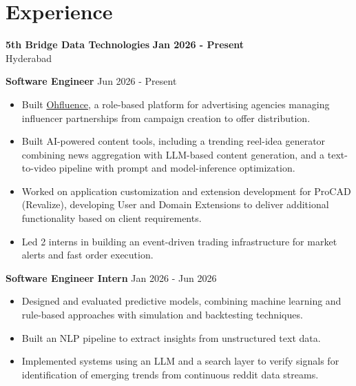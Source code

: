 \documentclass[a4paper,11pt]{article}
\newcommand{\resumeItem}[1]{\item \small{#1}}
\newcommand{\resumeSubheading}[4]{%
  \textbf{#1} \hfill \textbf{#2} \\
{#3} \hfill {#4}
}
\newcommand{\resumeSubHeadingListStart}{\begin{itemize}}
\newcommand{\resumeSubHeadingListEnd}{\end{itemize}}
\begin{document}
\section*{Experience}

\resumeSubheading
{5th Bridge Data Technologies}{Jan 2026 - Present}
{Hyderabad}{}

\textbf{Software Engineer} \hfill {Jun 2026 - Present}
\resumeSubHeadingListStart
\resumeItem{Built \href{https://ohfluence.com}{Ohfluence}, a role-based platform for advertising agencies managing influencer partnerships from campaign creation to offer distribution.}
\resumeItem{Built AI-powered content tools, including a trending reel-idea generator combining news aggregation with LLM-based content generation, and a text-to-video pipeline with prompt and model-inference optimization.}
\resumeItem{Worked on application customization and extension development for ProCAD (Revalize), developing User and Domain Extensions to deliver additional functionality based on client requirements.}
\resumeItem{Led 2 interns in building an event-driven trading infrastructure for market alerts and fast order execution.}
\resumeSubHeadingListEnd

\textbf{Software Engineer Intern} \hfill {Jan 2026 - Jun 2026}
\resumeSubHeadingListStart
\resumeItem{Designed and evaluated predictive models, combining machine learning and rule-based approaches with simulation and backtesting techniques.}
\resumeItem{Built an NLP pipeline to extract insights from unstructured text data.}
\resumeItem{Implemented systems using an LLM and a search layer to verify signals for identification of emerging trends from continuous reddit data streams.}
\resumeSubHeadingListEnd


\end{document}
